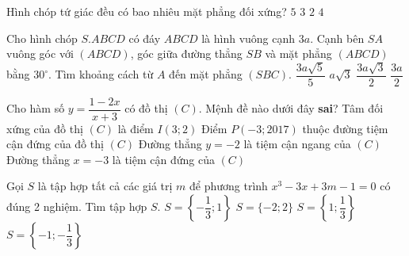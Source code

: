 \begin{ex}%
	Hình chóp tứ giác đều có bao nhiêu mặt phẳng đối xứng?
	\choice
	{$5$}
	{$3$}
	{$2$}
	{\True $4$}
\end{ex}



\begin{ex}%
	Cho hình chóp $S.ABCD$ có đáy $ABCD$ là hình vuông cạnh $3a$. Cạnh bên $SA$  vuông góc với $(ABCD)$, góc giữa đường thẳng $SB$ và mặt phẳng $(ABCD)$ bằng $30^\circ$. Tìm khoảng cách từ $A$ đến mặt phẳng $(SBC)$.
	\choice
	{$\dfrac{3a\sqrt{5}}{5}$}
	{$a\sqrt{3}$}
	{$\dfrac{3a\sqrt{3}}{2}$}
	{\True $\dfrac{3a}{2}$}
\end{ex}



\begin{ex}%
	Cho hàm số $y=\dfrac{1-2x}{x+3}$ có đồ thị $(C)$. Mệnh đề nào dưới đây \textbf{sai}?
	\choice
	{\True Tâm đối xứng của đồ thị $(C)$ là điểm $I(3;2)$}
	{Điểm $P(-3;2017)$ thuộc đường tiệm cận đứng của đồ thị $(C)$}
	{Đường thẳng $y=-2$ là tiệm cận ngang của $(C)$}
	{Đường thẳng $x=-3$ là tiệm cận đứng của $(C)$}
	
\end{ex}



\begin{ex}%
	Gọi $S$ là tập hợp tất cả các giá trị $m$ để phương trình $x^3-3x+3m-1=0$ có đúng 2 nghiệm. Tìm tập hợp $S$.
	\choice
	{\True $S=\left\{-\dfrac{1}{3};1\right\}$}
	{$S=\{-2;2\}$}
	{$S=\left\{1;\dfrac{1}{3}\right\}$}
	{$S=\left\{-1;-\dfrac{1}{3}\right\}$}
	
\end{ex}



